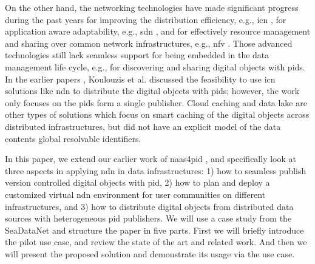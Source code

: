 \documentclass[conference]{IEEEtran}
\begin{document}

On the other hand, the networking technologies have made significant progress during the past years for improving the distribution efficiency, e.g., \gls{icn} \cite{zhang2014named}, for application aware adaptability, e.g., \gls{sdn} \cite{kreutz2014software}, and for effectively resource management and sharing over common network infrastructures, e.g., \gls{nfv} \cite{han2015network}. Those advanced technologies still lack seamless support for being embedded in the data management life cycle, e.g., for discovering and sharing digital objects with \glspl{pid}. In the earlier papers \cite{koulouzis2018information}, Koulouzis et al. discussed the feasibility to use \gls{icn} solutions like \gls{ndn} to distribute the digital objects with \glspl{pid}; however, the work only focuses on the \glspl{pid} form a single publisher. Cloud caching \cite{} and data lake \cite{} are other types of solutions which focus on smart caching of the digital objects across distributed infrastructures, but did not have an explicit model of the data contents global resolvable identifiers.

In this paper, we extend our earlier work of \gls{naas4pid} \cite{koulouzis2018information}, and specifically look at three aspects in applying \gls{ndn} in data infrastructures: 1) how to seamless publish version controlled digital objects with \gls{pid}, 2) how to plan and deploy a customized virtual \gls{ndn} environment for user communities on different infrastructures, and 3) how to distribute digital objects from distributed data sources with heterogeneous \gls{pid} publishers. We will use a case study from the SeaDataNet and structure the paper in five parts. First we will briefly introduce the pilot use case, and review the state of the art and related work. And then we will present the proposed solution and demonstrate its usage via the use case.
\end{document}
